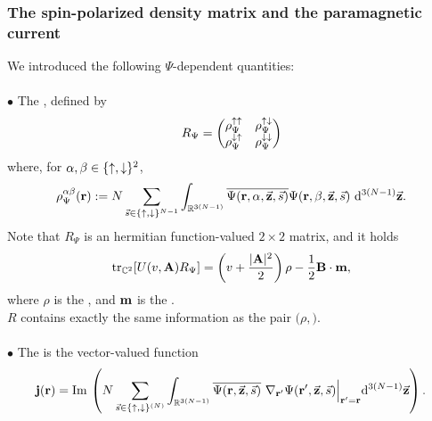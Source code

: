 \documentclass[9pt,xcolor=dvipsnames]{beamer}
\begin{document}

\begin{frame}

\frametitle{The spin-polarized density matrix and the paramagnetic current}

We introduced the following $\Psi$-dependent quantities: \\
~\\
$\bullet$ The , defined by
\[
	R_\Psi = \begin{pmatrix} \rho_\Psi^{{\uparrow} {\uparrow}} & \rho_\Psi^{{\uparrow} {\downarrow}} \\ \rho_\Psi^{{\downarrow} {\uparrow}} & \rho_\Psi^{{\downarrow} {\downarrow}} \end{pmatrix}
\]
where, for $\alpha, \beta \in \{ {\uparrow}, {\downarrow}\}^2$,
\[
	\rho^{\alpha \beta}_{\Psi}({\bold r}) := N \sum_{\vec{s} \in \{ {\uparrow}, {\downarrow}\}^{N-1}} \int_{{\mathbb R}^{3(N-1)}}\overline{\Psi ({\bold r}, \alpha,  \vec{{\bold z}}, \vec{s})} \Psi ({\bold r}, \beta, \vec{{\bold z}}, \vec{s})\  {\mathrm{d}}^{3(N-1)} \vec{{\bold z}}.
\]
Note that $R_\Psi$ is an hermitian function-valued $2 \times 2$ matrix, and it holds 
\[
	{\rm tr}_{{\mathbb C}^2} [ U(v,{\bold A}) R_\Psi ] =  \left( v + \frac{| {\bold A} |^2}{2} \right) \rho -\dfrac12  {\bold B} \cdot {\bold m},
\] 
where $\rho$ is the , and ${\bold m}$ is the . \\
 $R$ contains exactly the same information as the pair $(\rho, \bm)$.\\
~\\
$\bullet$ The  is the vector-valued function
\[
	{\bold j} ({\bold r}) = {\mathrm{Im }\, } \left( N \sum_{\vec{s} \in \{ {\uparrow}, {\downarrow}\}^{(N)}} \int_{{\mathbb R}^{3(N-1)}}  \overline{\Psi({\bold r}, \vec{{\bold z}}, \vec{s})}\  \nabla_{{\bold r}'} \Psi({\bold r}', \vec{{\bold z}}, \vec{s}) \Big|_{{\bold r}' = {\bold r}} {\mathrm{d}}^{3(N-1)} \vec{{\bold z}} \right).
\]
\end{frame}



\end{document}
